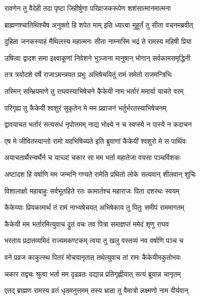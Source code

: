 
\twolineshloka
{रावणेन तु वैदेही तदा पृष्टा जिहीर्षुणा}
{परिव्राजकरूपेण शशंसात्मानमात्मना} %

\twolineshloka
{ब्राह्मणश्चातिथिश्चैष अनुक्तो हि शपेत माम्}
{इति ध्यात्वा मुहूर्तं तु सीता वचनमब्रवीत्} %

\twolineshloka
{दुहिता जनकस्याहं मैथिलस्य महात्मनः}
{सीता नाम्नास्मि भद्रं ते रामस्य महिषी प्रिया} %

\twolineshloka
{उषित्वा द्वादश समा इक्ष्वाकूणां निवेशने}
{भुञ्जाना मानुषान् भोगान् सर्वकामसमृद्धिनी} %

\twolineshloka
{तत्र त्रयोदशे वर्षे राजाऽमन्त्रयत प्रभुः}
{अभिषेचयितुं रामं समेतो राजमन्त्रिभिः} %

\twolineshloka
{तस्मिन् सम्भ्रियमाणे तु राघवस्याभिषेचने}
{कैकेयी नाम भर्तारं ममार्या याचते वरम्} %

\twolineshloka
{परिगृह्य तु कैकेयी श्वशुरं सुकृतेन मे}
{मम प्रव्राजनं भर्तुर्भरतस्याभिषेचनम्} %

\twolineshloka
{द्वावयाचत भर्तारं सत्यसंधं नृपोत्तमम्}
{नाद्य भोक्ष्ये न च स्वप्स्ये न पास्ये न कदाचन} %

\twolineshloka
{एष मे जीवितस्यान्तो रामो यदभिषिच्यते}
{इति ब्रुवाणां कैकेयीं श्वशुरो मे स पार्थिवः} %

\twolineshloka
{अयाचतार्थैरन्वर्थैर्न च याच्ञां चकार सा}
{मम भर्ता महातेजा वयसा पञ्चविंशकः} %

\twolineshloka
{अष्टादश हि वर्षाणि मम जन्मनि गण्यते}
{रामेति प्रथितो लोके सत्यवान् शीलवान् शुचिः} %

\twolineshloka
{विशालाक्षो महाबाहुः सर्वभूतहिते रतः}
{कामार्तश्च महाराजः पिता दशरथः स्वयम्} %

\twolineshloka
{कैकेय्याः प्रियकामार्थं तं रामं नाभ्यषेचयत्}
{अभिषेकाय तु पितुः समीपं राममागतम्} %

\twolineshloka
{कैकेयी मम भर्तारमित्युवाच द्रुतं वचः}
{तव पित्रा समाज्ञप्तं ममेदं शृणु राघव} %

\twolineshloka
{भरताय प्रदातव्यमिदं राज्यमकण्टकम्}
{त्वया तु खलु वस्तव्यं नव वर्षाणि पञ्च च} %

\twolineshloka
{वने प्रव्रज काकुत्स्थ पितरं मोचयानृतात्}
{तथेत्युवाच तां रामः कैकेयीमकुतोभयः} %

\twolineshloka
{चकार तद्वचः श्रुत्वा भर्ता मम दृढव्रतः}
{दद्यान्न प्रतिगृह्णीयात् सत्यं ब्रूयान्न चानृतम्} %

\twolineshloka
{एतद् ब्राह्मण रामस्य व्रतं धृतमनुत्तमम्}
{तस्य भ्राता तु वैमात्रो लक्ष्मणो नाम वीर्यवान्} %

